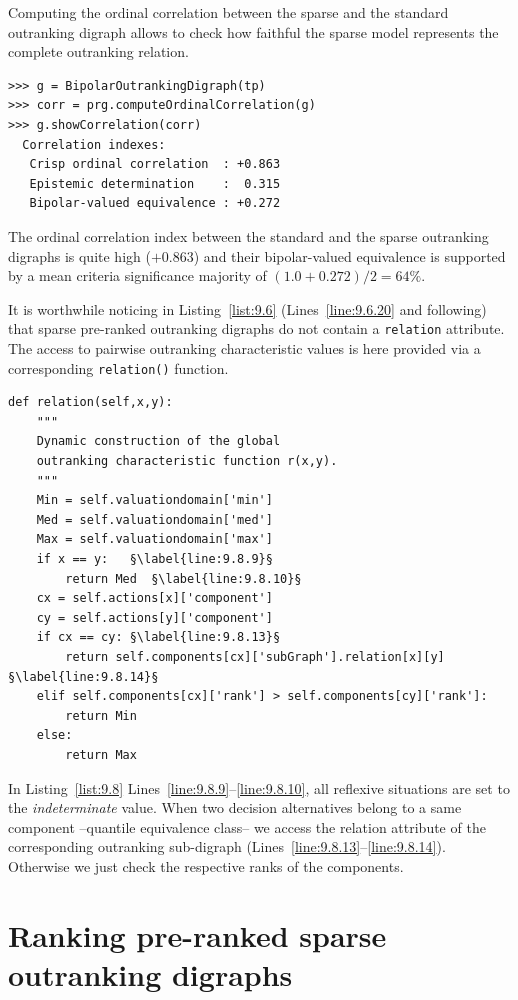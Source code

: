 Computing the ordinal correlation between the sparse and the standard outranking digraph allows to check how faithful the sparse model represents the complete outranking relation.
\begin{lstlisting}
>>> g = BipolarOutrankingDigraph(tp)
>>> corr = prg.computeOrdinalCorrelation(g)
>>> g.showCorrelation(corr)
  Correlation indexes:
   Crisp ordinal correlation  : +0.863
   Epistemic determination    :  0.315
   Bipolar-valued equivalence : +0.272
\end{lstlisting}   

The ordinal correlation index between the standard and the sparse outranking digraphs is quite high ($+0.863$) and their bipolar-valued equivalence is supported by a mean criteria significance majority of $(1.0+0.272)/2 = 64\%$.

It is worthwhile noticing in Listing~\vref{list:9.6} (Lines~\ref{line:9.6.20} and following) that sparse pre-ranked outranking digraphs do not contain a \texttt{relation} attribute. The access to pairwise outranking characteristic values is here provided via a corresponding \texttt{relation()} function.
\begin{lstlisting}[caption={Functional binary relation characteristics},label=list:9.8]
def relation(self,x,y):
    """
    Dynamic construction of the global
    outranking characteristic function r(x,y).
    """
    Min = self.valuationdomain['min']
    Med = self.valuationdomain['med']
    Max = self.valuationdomain['max']
    if x == y:   §\label{line:9.8.9}§
        return Med  §\label{line:9.8.10}§
    cx = self.actions[x]['component']
    cy = self.actions[y]['component']
    if cx == cy: §\label{line:9.8.13}§
        return self.components[cx]['subGraph'].relation[x][y] §\label{line:9.8.14}§
    elif self.components[cx]['rank'] > self.components[cy]['rank']:
        return Min
    else:
        return Max
\end{lstlisting}

In Listing~\vref{list:9.8} Lines~\ref{line:9.8.9}--\ref{line:9.8.10}, all reflexive situations are set to the \emph{indeterminate} value. When two decision alternatives belong to a same component --quantile equivalence class-- we access the relation attribute of the corresponding outranking sub-digraph (Lines~\ref{line:9.8.13}--\ref{line:9.8.14}). Otherwise we just check the respective ranks of the components.

\section{Ranking pre-ranked sparse outranking digraphs}
\label{sec:9.4}

